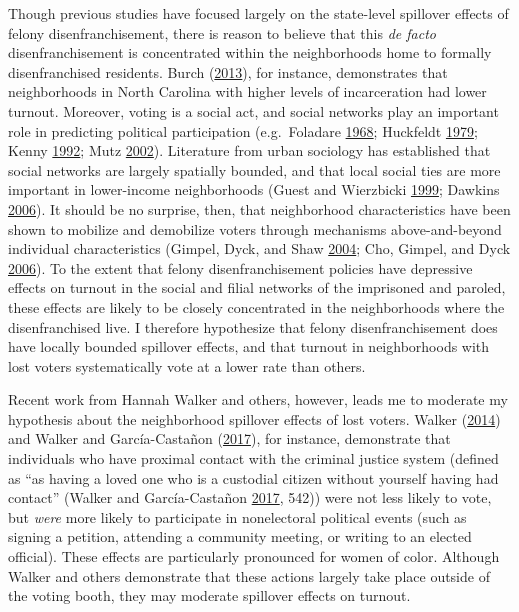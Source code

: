 \documentclass[
  12pt,
]{article}
\begin{document}
Though previous studies have focused largely on the state-level spillover effects of felony disenfranchisement, there is reason to believe that this \emph{de facto} disenfranchisement is concentrated within the neighborhoods home to formally disenfranchised residents. Burch (\protect\hyperlink{ref-Burch2013}{2013}), for instance, demonstrates that neighborhoods in North Carolina with higher levels of incarceration had lower turnout. Moreover, voting is a social act, and social networks play an important role in predicting political participation (e.g.~Foladare \protect\hyperlink{ref-Foladare1968}{1968}; Huckfeldt \protect\hyperlink{ref-Huckfeldt1979}{1979}; Kenny \protect\hyperlink{ref-Kenny1992}{1992}; Mutz \protect\hyperlink{ref-Mutz2002}{2002}). Literature from urban sociology has established that social networks are largely spatially bounded, and that local social ties are more important in lower-income neighborhoods (Guest and Wierzbicki \protect\hyperlink{ref-Guest1999}{1999}; Dawkins \protect\hyperlink{ref-Dawkins2006}{2006}). It should be no surprise, then, that neighborhood characteristics have been shown to mobilize and demobilize voters through mechanisms above-and-beyond individual characteristics (Gimpel, Dyck, and Shaw \protect\hyperlink{ref-Gimpel2004}{2004}; Cho, Gimpel, and Dyck \protect\hyperlink{ref-Cho2006}{2006}). To the extent that felony disenfranchisement policies have depressive effects on turnout in the social and filial networks of the imprisoned and paroled, these effects are likely to be closely concentrated in the neighborhoods where the disenfranchised live. I therefore hypothesize that felony disenfranchisement does have locally bounded spillover effects, and that turnout in neighborhoods with lost voters systematically vote at a lower rate than others.

Recent work from Hannah Walker and others, however, leads me to moderate my hypothesis about the neighborhood spillover effects of lost voters. Walker (\protect\hyperlink{ref-Walker2014}{2014}) and Walker and García-Castañon (\protect\hyperlink{ref-Walker2017}{2017}), for instance, demonstrate that individuals who have proximal contact with the criminal justice system (defined as ``as having a loved one who is a custodial citizen without yourself having had contact'' (Walker and García-Castañon \protect\hyperlink{ref-Walker2017}{2017}, 542)) were not less likely to vote, but \emph{were} more likely to participate in nonelectoral political events (such as signing a petition, attending a community meeting, or writing to an elected official). These effects are particularly pronounced for women of color. Although Walker and others demonstrate that these actions largely take place outside of the voting booth, they may moderate spillover effects on turnout.
\end{document}
